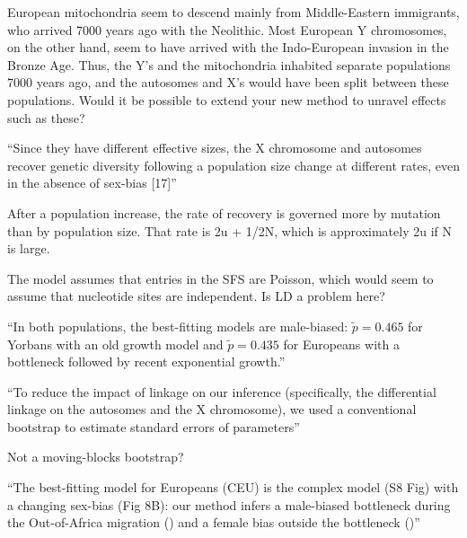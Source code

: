 European mitochondria seem to descend mainly from Middle-Eastern
immigrants, who arrived 7000 years ago with the Neolithic. Most
European Y chromosomes, on the other hand, seem to have arrived with
the Indo-European invasion in the Bronze Age. Thus, the Y's and the
mitochondria inhabited separate populations 7000 years ago, and the
autosomes and X's would have been split between these
populations. Would it be possible to extend your new method to unravel
effects such as these?

``Since they have different effective sizes, the X chromosome and
autosomes recover genetic diversity following a population size change
at different rates, even in the absence of sex-bias [17]''

After a population increase, the rate of recovery is governed more by
mutation than by population size. That rate is 2u + 1/2N, which is
approximately 2u if N is large.

The model assumes that entries in the SFS are Poisson, which would
seem to assume that nucleotide sites are independent. Is LD a problem
here?

``In both populations, the best-fitting models are male-biased:
$\tilde p = 0.465$ for Yorbans with an old growth model and $\tilde p
= 0.435$ for Europeans with a bottleneck followed by recent
exponential growth.''

``To reduce the impact of linkage on our inference (specifically, the
differential linkage on the autosomes and the X chromosome), we used a
conventional bootstrap to estimate standard errors of parameters''

Not a moving-blocks bootstrap?

``The best-fitting model for Europeans (CEU) is the complex model (S8
Fig) with a changing sex-bias (Fig 8B): our method infers a
male-biased bottleneck during the Out-of-Africa migration () and a
female bias outside the bottleneck ()'' 
